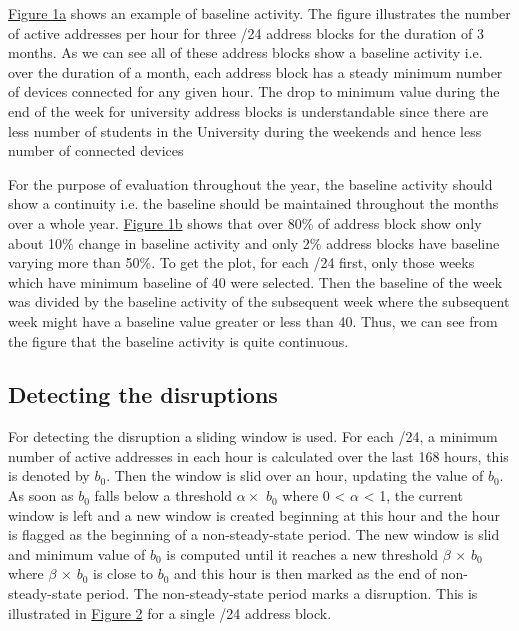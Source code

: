 \documentclass[11pt,twoside,a4paper]{article}
\begin{document}
\hyperref[fig:BaselineDef]{Figure 1a} shows an example of baseline activity. The figure illustrates the number of active addresses per hour for three /24 address blocks for the duration of 3 months. As we can see all of these address blocks show a baseline activity i.e. over the duration of a month, each address block has a steady minimum number of devices connected for any given hour. The drop to minimum value during the end of the week for university address blocks is understandable since there are less number of students in the University during the weekends and hence less number of connected devices

For the purpose of evaluation throughout the year, the baseline activity should show a continuity i.e. the baseline should be maintained throughout the months over a whole year. \hyperref[fig:BaselineDef]{Figure 1b} shows that over 80\% of address block show only about 10\% change in baseline activity and only 2\% address blocks have baseline varying more than 50\%. To get the plot, for each /24 first, only those weeks which have minimum baseline of 40 were selected. Then the baseline of the week was divided by the baseline activity of the subsequent week where the subsequent week might have a baseline value greater or less than 40. Thus, we can see from the figure that the baseline activity is quite continuous.

\subsection{Detecting the disruptions}
For detecting the disruption a sliding window is used. For each /24, a minimum number of active addresses in each hour is calculated over the last 168 hours, this is denoted by $b_0$. Then the window is slid over an hour, updating the value of $b_0$. As soon as $b_0$ falls below a threshold $\alpha \times$ $b_0$ where 0 < $ \alpha$ < 1, the current window is left and a new window is created beginning at this hour and the hour is flagged as the beginning of a non-steady-state period. The new window is slid and minimum value of $b_0$ is computed until it reaches a new threshold $\beta$ $\times$ $b_0$ where $\beta$ $\times$ $b_0$ is close to $b_0$ and this hour is then marked as the end of non-steady-state period. The non-steady-state period marks a disruption. This is illustrated in \hyperref[fig:DisruptionDec]{Figure 2} for a single /24 address block.
\end{document}
